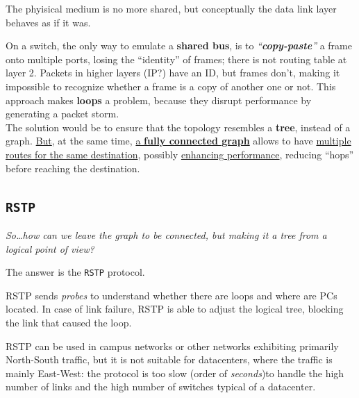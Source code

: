 The phyisical medium is no more shared, but conceptually the data link layer behaves as if it was.

On a switch, the only way to emulate a \textbf{shared bus}, is to \textit{``\textbf{copy-paste}''} a frame onto multiple ports, losing the ``identity'' of frames; there is not routing table at layer 2. Packets in higher layers (IP?) have an ID, but frames don't, making it impossible to recognize whether a frame is a copy of another one or not.
This approach makes \textbf{loops} a problem, because they disrupt performance by generating a packet storm.\\
The solution would be to ensure that the topology resembles a \textbf{tree}, instead of a graph.
\ul{But}, at the same time, \ul{a \textbf{fully connected graph}} allows to have \ul{multiple routes for the same destination}, possibly \ul{enhancing performance}, reducing ``hops'' before reaching the destination.

\subsection{\texttt{RSTP}}
\begin{center}
   \textit{So\dots how can we leave the graph to be connected, but making it a tree from a logical point of view?}

   The answer is the \texttt{RSTP} protocol.
\end{center}

RSTP sends \textit{probes} to understand whether there are loops and where are PCs located.
In case of link failure, RSTP is able to adjust the logical tree, blocking the link that caused the loop.

RSTP can be used in campus networks or other networks exhibiting primarily North-South traffic, but it is not suitable for datacenters, where the traffic is mainly East-West:
the protocol is too slow (order of \textit{seconds})to handle the high number of links and the high number of switches typical of a datacenter.

